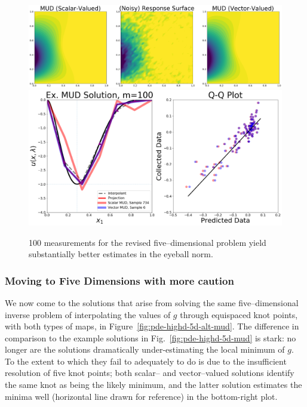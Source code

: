 \begin{figure}[htbp]
\centering
  \includegraphics[width=0.95\linewidth]{figures/pde-highd/pde-highd_surf_exmud_D5-alt_m100.png}
  \includegraphics[width=0.9\linewidth]{figures/pde-highd/pde-highd-alt_comp_exmud_D5_m100.png}
\caption{
100 measurements for the revised five--dimensional problem yield substantially better estimates in the eyeball norm.
}
\label{fig:pde-highd-5d-alt-example}
\end{figure}


\subsubsection{Moving to Five Dimensions with more caution}

We now come to the solutions that arise from solving the same five--dimensional inverse problem of interpolating the values of $g$ through equispaced knot points, with both types of maps, in Figure~\ref{fig:pde-highd-5d-alt-mud}.
The difference in comparison to the example solutions in Fig.~\ref{fig:pde-highd-5d-mud} is stark: no longer are the solutions dramatically under-estimating the local minimum of $g$.
To the extent to which they fail to adequately to do is due to the insufficient resolution of five knot points; both scalar-- and vector--valued solutions identify the same knot as being the likely minimum, and the latter solution estimates the minima well (horizontal line drawn for reference) in the bottom-right plot.

